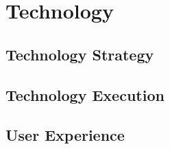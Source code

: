 \part{Technology}\label{pt:ekgmm-c}

\chapter{Technology Strategy}\label{ch:ekgmm-c-1}


\chapter{Technology Execution}\label{ch:ekgmm-c-2}


\chapter{User Experience}\label{ch:ekgmm-c-3}

